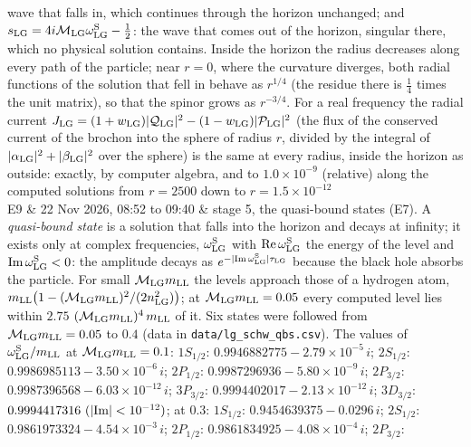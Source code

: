 \documentclass[
  10pt,
]{article}
\begin{document}
\begin{longtable}[]
wave that falls in, which continues through the horizon unchanged; and
\(s_{\rm LG}=4i\mathcal M_{\rm LG}\omega^{\rm S}_{\rm LG}-\tfrac12\):
the wave that comes out of the horizon, singular there, which no
physical solution contains. Inside the horizon the radius decreases
along every path of the particle; near \(r=0\), where the curvature
diverges, both radial functions of the solution that fell in behave as
\(r^{1/4}\) (the residue there is \(\tfrac14\) times the unit matrix),
so that the spinor grows as \(r^{-3/4}\). For a real frequency the
radial current
\(J_{\rm LG}=(1+w_{\rm LG})\lvert\mathcal Q_{\rm LG}\rvert^2-(1-w_{\rm LG})\lvert\mathcal P_{\rm LG}\rvert^2\)
(the flux of the conserved current of the brochon into the sphere of
radius \(r\), divided by the integral of
\(\lvert\alpha_{\rm LG}\rvert^2+\lvert\beta_{\rm LG}\rvert^2\) over the
sphere) is the same at every radius, inside the horizon as outside:
exactly, by computer algebra, and to \(1.0\times10^{-9}\) (relative)
along the computed solutions from \(r=2500\) down to
\(r=1.5\times10^{-12}\) \\
E9 & 22 Nov 2026, 08:52 to 09:40 & stage 5, the quasi-bound states (E7).
A \emph{quasi-bound state} is a solution that falls into the horizon and
decays at infinity; it exists only at complex frequencies,
\(\omega^{\rm S}_{\rm LG}\) with \({\rm Re}\,\omega^{\rm S}_{\rm LG}\)
the energy of the level and \({\rm Im}\,\omega^{\rm S}_{\rm LG}<0\): the
amplitude decays as
\(e^{-\lvert{\rm Im}\,\omega^{\rm S}_{\rm LG}\rvert\tau_{\rm LG}}\)
because the black hole absorbs the particle. For small
\(\mathcal M_{\rm LG}m_{\rm LL}\) the levels approach those of a
hydrogen atom,
\(m_{\rm LL}\big(1-(\mathcal M_{\rm LG}m_{\rm LL})^2/(2n_{\rm LG}^2)\big)\);
at \(\mathcal M_{\rm LG}m_{\rm LL}=0.05\) every computed level lies
within \(2.75\) \((\mathcal M_{\rm LG}m_{\rm LL})^4\,m_{\rm LL}\) of it.
Six states were followed from \(\mathcal M_{\rm LG}m_{\rm LL}=0.05\) to
\(0.4\) (data in \texttt{data/lg\_schw\_qbs.csv}). The values of
\(\omega^{\rm S}_{\rm LG}/m_{\rm LL}\) at
\(\mathcal M_{\rm LG}m_{\rm LL}=0.1\): \(1S_{1/2}\):
\(0.9946882775-2.79\times10^{-5}\,i\); \(2S_{1/2}\):
\(0.9986985113-3.50\times10^{-6}\,i\); \(2P_{1/2}\):
\(0.9987296936-5.80\times10^{-9}\,i\); \(2P_{3/2}\):
\(0.9987396568-6.03\times10^{-12}\,i\); \(3P_{3/2}\):
\(0.9994402017-2.13\times10^{-12}\,i\); \(3D_{3/2}\):
\(0.9994417316\ (\lvert{\rm Im}\rvert<10^{-12})\); at \(0.3\):
\(1S_{1/2}\): \(0.9454639375-0.0296\,i\); \(2S_{1/2}\):
\(0.9861973324-4.54\times10^{-3}\,i\); \(2P_{1/2}\):
\(0.9861834925-4.08\times10^{-4}\,i\); \(2P_{3/2}\):

\end{longtable}
\end{document}
